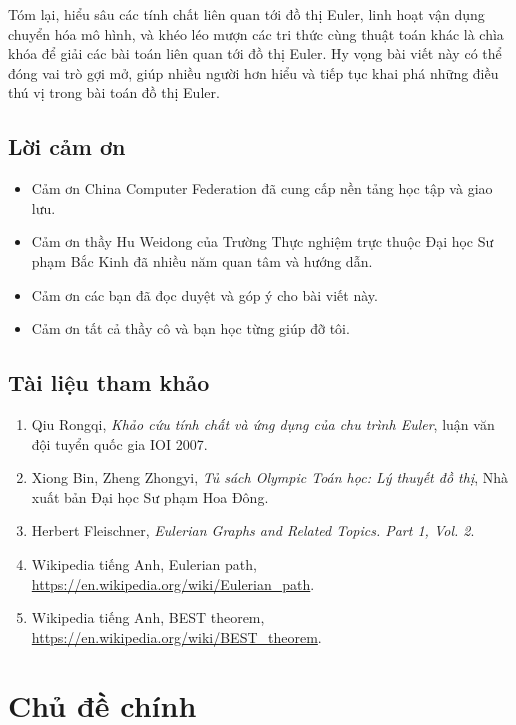 \documentclass[11pt]{article}
\begin{document}
Tóm lại, hiểu sâu các tính chất liên quan tới đồ thị Euler, linh hoạt vận dụng
chuyển hóa mô hình, và khéo léo mượn các tri thức cùng thuật toán khác là chìa
khóa để giải các bài toán liên quan tới đồ thị Euler. Hy vọng bài viết này có
thể đóng vai trò gợi mở, giúp nhiều người hơn hiểu và tiếp tục khai phá những
điều thú vị trong bài toán đồ thị Euler.

\subsection*{Lời cảm ơn}

\begin{itemize}
  \item Cảm ơn China Computer Federation đã cung cấp nền tảng học tập và giao
  lưu.
  \item Cảm ơn thầy Hu Weidong của Trường Thực nghiệm trực thuộc Đại học Sư
  phạm Bắc Kinh đã nhiều năm quan tâm và hướng dẫn.
  \item Cảm ơn các bạn đã đọc duyệt và góp ý cho bài viết này.
  \item Cảm ơn tất cả thầy cô và bạn học từng giúp đỡ tôi.
\end{itemize}

\subsection*{Tài liệu tham khảo}

\begin{enumerate}
  \item Qiu Rongqi, \emph{Khảo cứu tính chất và ứng dụng của chu trình Euler},
  luận văn đội tuyển quốc gia IOI 2007.
  \item Xiong Bin, Zheng Zhongyi, \emph{Tủ sách Olympic Toán học: Lý thuyết đồ
  thị}, Nhà xuất bản Đại học Sư phạm Hoa Đông.
  \item Herbert Fleischner, \emph{Eulerian Graphs and Related Topics. Part 1,
  Vol. 2}.
  \item Wikipedia tiếng Anh, Eulerian path,
  \url{https://en.wikipedia.org/wiki/Eulerian_path}.
  \item Wikipedia tiếng Anh, BEST theorem,
  \url{https://en.wikipedia.org/wiki/BEST_theorem}.
\end{enumerate}

\section{Chủ đề chính}
\end{document}
